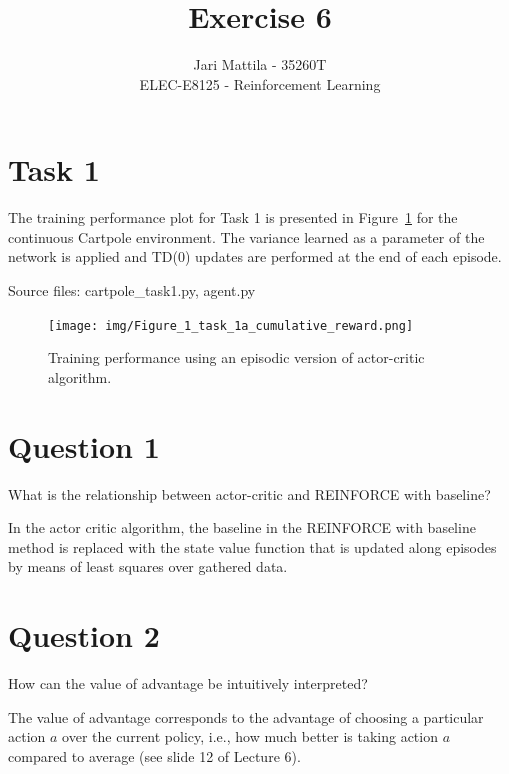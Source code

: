 \documentclass[12pt]{article}
\begin{document}
 
\title{Exercise 6}
\author{Jari Mattila - 35260T\\
ELEC-E8125 - Reinforcement Learning}

\maketitle

\section*{Task 1}

The training performance plot for Task 1 is presented in Figure~\ref*{fig:fig1} for the continuous Cartpole environment. 
The variance learned as a parameter of the network is applied and TD(0) updates are performed at the end of each episode.
\newline

\noindent
Source files: cartpole\_task1.py, agent.py

\begin{figure}[phb] 
	\centering  %
    \texttt{[image: img/Figure\_1\_task\_1a\_cumulative\_reward.png]}
	\caption{Training performance using an episodic version of actor-critic algorithm.}
	\label{fig:fig1}
\end{figure}

\pagebreak


\section*{Question 1}

What is the relationship between actor-critic and REINFORCE with baseline?
\newline

In the actor critic algorithm, the baseline in the REINFORCE with baseline method is replaced with the state value function that is updated along episodes by means of least squares over gathered data. 

\section*{Question 2}

How can the value of advantage be intuitively interpreted?
\newline

The value of advantage corresponds to the advantage of choosing a particular action $a$ over the current policy, i.e., how much better is taking action $a$ compared to average (see slide 12 of Lecture 6).
\end{document}

